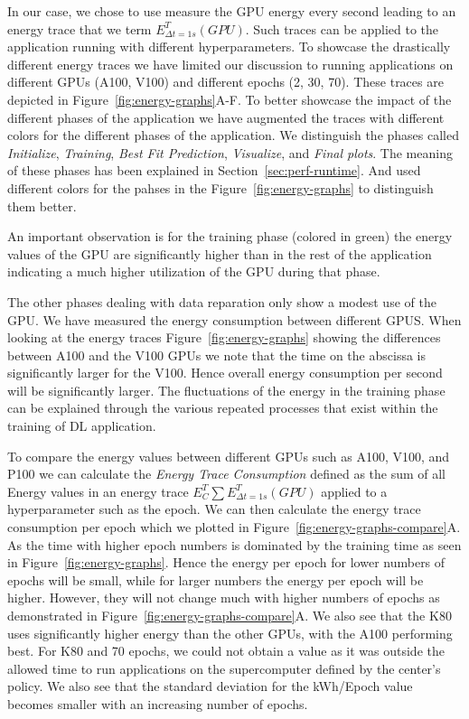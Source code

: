 \documentclass[utf8]{FrontiersinVancouver} %
\newcommand{\TODO}[2]{\todo[inline]{{\bf \color{red} #1} #2}}
\begin{document}
In our case, we chose to use measure the GPU energy every second leading to an energy trace that we term $E^T_{\Delta t=1s}(GPU)$. Such traces can be applied to the application running with different hyperparameters. To showcase the 
drastically different energy traces we have limited our discussion to running applications on different GPUs (A100, V100) and different epochs (2, 30, 70). These traces are depicted in Figure~\ref{fig:energy-graphs}A-F.  To better showcase the impact of the different phases of the application we have augmented the traces with different colors for the different phases of the application.
We distinguish the phases called {\em Initialize},  {\em Training}, {\em Best Fit Prediction}, {\em Visualize}, and {\em Final plots}. The meaning of these phases has been explained in Section~\ref{sec:perf-runtime}. And used different colors for the pahses in the Figure~\ref{fig:energy-graphs} to distinguish them better.

An important observation is for the training phase (colored in green) the energy values of the GPU are significantly higher than in the rest of the application indicating a much higher utilization of the GPU during that phase. 

The other phases dealing with data reparation only show a modest
use of the GPU. We have measured the energy consumption between
different GPUS. 
When looking at the energy traces Figure~\ref{fig:energy-graphs} showing the differences between A100 and the V100 GPUs we note that the time on the 
abscissa is significantly larger for the V100. Hence overall energy consumption per second will be significantly larger. The fluctuations of the energy in the training phase can be explained through the various repeated processes that exist within the training of DL application.


To compare the energy values between different GPUs such as A100, V100, and P100 we can calculate the {\em Energy Trace Consumption} defined as the sum of all Energy values in an energy trace 
$E^T_C \sum E^T_{\Delta t=1s}(GPU)$ 
applied to a hyperparameter such as the epoch.  We can then calculate the energy trace consumption per epoch which we plotted
in
Figure~\ref{fig:energy-graphs-compare}A.
As the time with higher epoch numbers is dominated by the training time as seen in Figure~\ref{fig:energy-graphs}.
Hence the energy per epoch for lower numbers of epochs will be small, while for larger numbers the energy per epoch will be higher. However, they will not change much with higher numbers of epochs as demonstrated in Figure~\ref{fig:energy-graphs-compare}A.
We also see that the K80 uses significantly higher energy than the other GPUs, with the A100 performing best. For K80 and 70 epochs, we could not obtain a value as it was outside the allowed time to run applications on the supercomputer defined by the center's policy.
We also see that the standard deviation for the kWh/Epoch value becomes smaller with an increasing number of epochs. 
\end{document}
